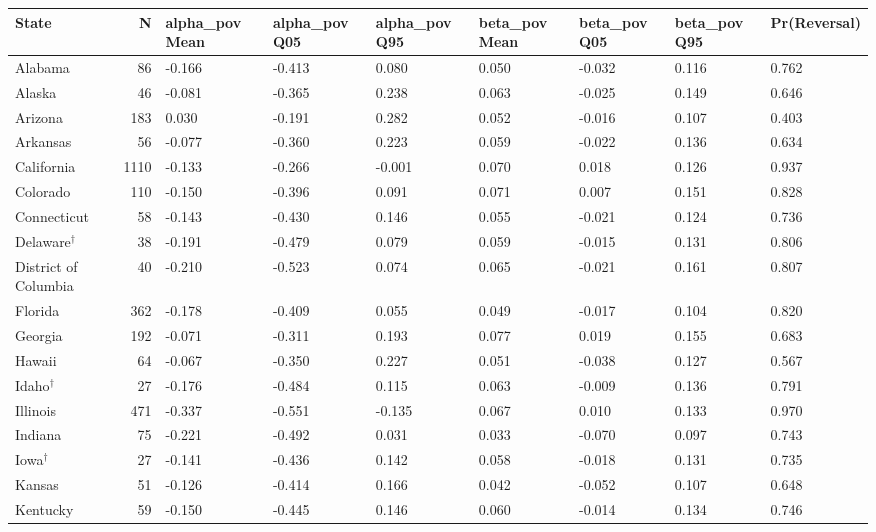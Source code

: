 \begin{table}[htbp]
\centering
\begin{tabular}{lrlllllll}
  \toprule
State & N & alpha_pov Mean & alpha_pov Q05 & alpha_pov Q95 & beta_pov Mean & beta_pov Q05 & beta_pov Q95 & Pr(Reversal) \\ 
  \midrule
Alabama &  86 & -0.166 & -0.413 & 0.080 & 0.050 & -0.032 & 0.116 & 0.762 \\ 
  Alaska &  46 & -0.081 & -0.365 & 0.238 & 0.063 & -0.025 & 0.149 & 0.646 \\ 
  Arizona & 183 & 0.030 & -0.191 & 0.282 & 0.052 & -0.016 & 0.107 & 0.403 \\ 
  Arkansas &  56 & -0.077 & -0.360 & 0.223 & 0.059 & -0.022 & 0.136 & 0.634 \\ 
  California & 1110 & -0.133 & -0.266 & -0.001 & 0.070 & 0.018 & 0.126 & 0.937 \\ 
  Colorado & 110 & -0.150 & -0.396 & 0.091 & 0.071 & 0.007 & 0.151 & 0.828 \\ 
  Connecticut &  58 & -0.143 & -0.430 & 0.146 & 0.055 & -0.021 & 0.124 & 0.736 \\ 
  Delaware$^{\dagger}$ &  38 & -0.191 & -0.479 & 0.079 & 0.059 & -0.015 & 0.131 & 0.806 \\ 
  District of Columbia &  40 & -0.210 & -0.523 & 0.074 & 0.065 & -0.021 & 0.161 & 0.807 \\ 
  Florida & 362 & -0.178 & -0.409 & 0.055 & 0.049 & -0.017 & 0.104 & 0.820 \\ 
  Georgia & 192 & -0.071 & -0.311 & 0.193 & 0.077 & 0.019 & 0.155 & 0.683 \\ 
  Hawaii &  64 & -0.067 & -0.350 & 0.227 & 0.051 & -0.038 & 0.127 & 0.567 \\ 
  Idaho$^{\dagger}$ &  27 & -0.176 & -0.484 & 0.115 & 0.063 & -0.009 & 0.136 & 0.791 \\ 
  Illinois & 471 & -0.337 & -0.551 & -0.135 & 0.067 & 0.010 & 0.133 & 0.970 \\ 
  Indiana &  75 & -0.221 & -0.492 & 0.031 & 0.033 & -0.070 & 0.097 & 0.743 \\ 
  Iowa$^{\dagger}$ &  27 & -0.141 & -0.436 & 0.142 & 0.058 & -0.018 & 0.131 & 0.735 \\ 
  Kansas &  51 & -0.126 & -0.414 & 0.166 & 0.042 & -0.052 & 0.107 & 0.648 \\ 
  Kentucky &  59 & -0.150 & -0.445 & 0.146 & 0.060 & -0.014 & 0.134 & 0.746 \\ 

\end{tabular}
\end{table}
